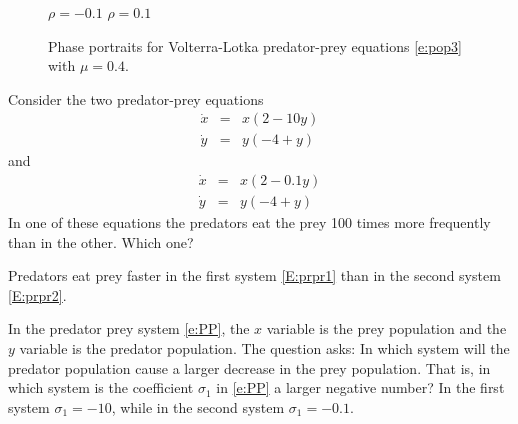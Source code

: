 \documentclass{ximera}
\begin{document}
\begin{figure}[htb]
           \centerline{%
	   }
		\vspace*{-0.2in}		
		\hspace{1.0in} $\rho=-0.1$ \hspace{2.5in} $\rho=0.1$
           \caption{Phase portraits for Volterra-Lotka predator-prey 
		equations \protect\eqref{e:pop3} with $\mu=0.4$.}
           \label{F:pop3}
\end{figure}

\EXER

\TEXER

\begin{exercise} \label{c9.1.5}
Consider the two predator-prey equations
\begin{equation} \label{E:prpr1}
\begin{array}{rcl}
\dot{x} & = & x(2-10y)\\
\dot{y} & = & y(-4+y)
\end{array}
\end{equation}
and 
\begin{equation} \label{E:prpr2}
\begin{array}{rcl}
\dot{x} & = & x(2-0.1y)\\
\dot{y} & = & y(-4+y)
\end{array}
\end{equation}
In one of these equations the predators eat the prey 100 times more 
frequently than in the other.  Which one?

\begin{solution}

\ans Predators eat prey faster in the first system \eqref{E:prpr1} than in 
the second system \eqref{E:prpr2}.

\soln  In the predator prey system \eqref{e:PP}, the $x$ variable is the
prey population and the $y$ variable is the predator population.  The
question asks: In which system will the predator population cause a
larger decrease in the prey population.  That is, in which system is
the coefficient $\sigma_1$ in \eqref{e:PP} a larger negative number?  In
the first system $\sigma_1=-10$, while in the second system $\sigma_1=-0.1$.

\end{solution}
\end{exercise}
\end{document}
